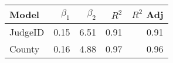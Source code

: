 \begin{tabular}{lrrrr}
\toprule
  Model &  $\beta_1$ &  $\beta_2$ &  $R^2$ &  $R^2$ Adj \\
\midrule
JudgeID &  0.15 &     6.51 &   0.91 &       0.91 \\
 County &  0.16 &     4.88 &   0.97 &       0.96 \\
\bottomrule
\end{tabular}
